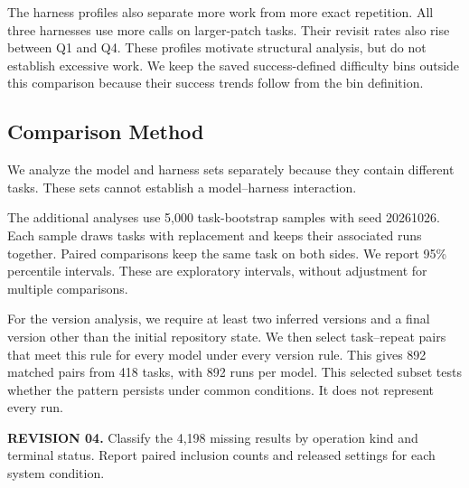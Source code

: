 \documentclass[10pt,a4paper,twocolumn]{article}
\newcommand{\rev}[2]{\par\smallskip\noindent\begin{minipage}{\linewidth}\color{revision}\footnotesize\textbf{REVISION #1.} #2\end{minipage}\par\smallskip}
\begin{document}
The harness profiles also separate more work from more exact repetition. All three harnesses use more calls on larger-patch tasks. Their revisit rates also rise between Q1 and Q4. These profiles motivate structural analysis, but do not establish excessive work. We keep the saved success-defined difficulty bins outside this comparison because their success trends follow from the bin definition.

\subsection{Comparison Method}\label{sec:comparison}
We analyze the model and harness sets separately because they contain different tasks. These sets cannot establish a model--harness interaction.

The additional analyses use 5,000 task-bootstrap samples with seed 20261026. Each sample draws tasks with replacement and keeps their associated runs together. Paired comparisons keep the same task on both sides. We report 95\% percentile intervals. These are exploratory intervals, without adjustment for multiple comparisons.

For the version analysis, we require at least two inferred versions and a final version other than the initial repository state. We then select task--repeat pairs that meet this rule for every model under every version rule. This gives 892 matched pairs from 418 tasks, with 892 runs per model. This selected subset tests whether the pattern persists under common conditions. It does not represent every run.
\rev{04}{Classify the 4,198 missing results by operation kind and terminal status. Report paired inclusion counts and released settings for each system condition.}
\end{document}
